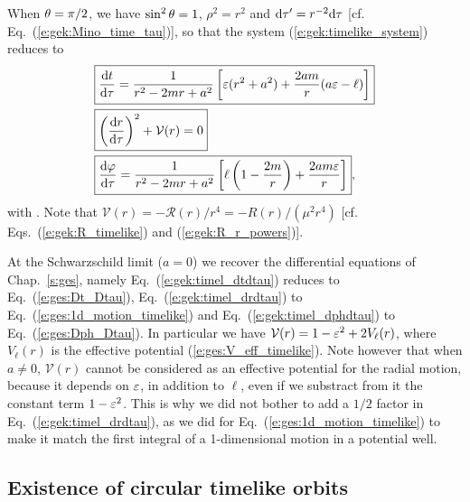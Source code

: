 When $\theta=\pi/2$, we have $\sin^2\theta=1$, $\rho^2 = r^2$ and $\mathrm{d}\tau' = r^{-2}\mathrm{d}\tau$
[cf. Eq.~(\ref{e:gek:Mino_time_tau})], so that the system
(\ref{e:gek:timelike_system}) reduces to
\begin{subequations}
\label{e:gek:equat_time_system}
\begin{align}
& \fbox{$\displaystyle  \frac{\mathrm{d} t}{\mathrm{d}\tau} = \frac{1}{r^2 - 2 m r + a^2} \left[
    \varepsilon(r^2 + a^2) + \frac{2 a m}{r} (a\varepsilon - \ell) \right] $} \label{e:gek:timel_dtdtau} \\
& \fbox{$\displaystyle  \left( \frac{\mathrm{d} r}{\mathrm{d} \tau} \right) ^2 + \mathcal{V}(r) = 0 $}\label{e:gek:timel_drdtau} \\
& \fbox{$\displaystyle  \frac{\mathrm{d}\varphi}{\mathrm{d}\tau} = \frac{1}{r^2 - 2 m r + a^2} \left[
    \ell \left( 1 - \frac{2m}{r} \right)
    + \frac{2 am \varepsilon}{r} \right] $},  \label{e:gek:timel_dphdtau}
\end{align}
\end{subequations}
with
\be \label{e:gek:def_V_time_equat}
   .
\ee
Note that $\mathcal{V}(r) = - \mathcal{R}(r)/r^4 = - R(r) / (\mu^2 r^4)$ [cf. Eqs.~(\ref{e:gek:R_timelike}) and (\ref{e:gek:R_r_powers})].
\begin{remark}
At the Schwarzschild limit ($a=0$) we recover the differential equations of Chap.~\ref{s:ges},
namely Eq.~(\ref{e:gek:timel_dtdtau}) reduces to Eq.~(\ref{e:ges:Dt_Dtau}),
Eq.~(\ref{e:gek:timel_drdtau}) to Eq.~(\ref{e:ges:1d_motion_timelike}) and
Eq.~(\ref{e:gek:timel_dphdtau}) to Eq.~(\ref{e:ges:Dph_Dtau}). In particular
we have $\mathcal{V}(r) = 1 - \varepsilon^2 + 2 V_\ell(r)$, where $V_\ell(r)$
is the effective potential (\ref{e:ges:V_eff_timelike}). Note however that
when $a\neq 0$, $\mathcal{V}(r)$ cannot be considered as an effective
potential for the radial motion, because it depends on $\varepsilon$, in addition
to $\ell$, even if we substract from it the constant term $1 - \varepsilon^2$.
This is why we did not bother to add a $1/2$ factor in Eq.~(\ref{e:gek:timel_drdtau}),
as we did for Eq.~(\ref{e:ges:1d_motion_timelike}) to make it match
the first integral of a 1-dimensional motion in a potential well.
\end{remark}

\subsection{Existence of circular timelike orbits}

